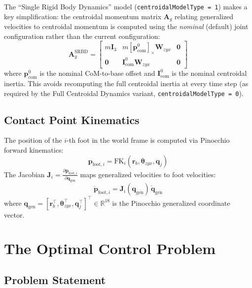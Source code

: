 \documentclass[11pt,a4paper]{article}
\newcommand{\R}{\mathbb{R}}
\newcommand{\skewmat}[1]{\left[ #1 \right]_\times}
\begin{document}
The ``Single Rigid Body Dynamics'' model (\texttt{centroidalModelType = 1}) makes a key simplification: the centroidal momentum matrix $\bm{A}_g$ relating generalized velocities to centroidal momentum is computed using the \emph{nominal} (default) joint configuration rather than the current configuration:
\begin{equation}
	\bm{A}_g^{\text{SRBD}} = \begin{bmatrix}
		m\bm{I}_3 & m\skewmat{\bm{p}_{\text{com}}^0}\bm{W}_{zyx} & \bm{0} \\
		\bm{0}    & \bm{I}_{\text{com}}^0 \bm{W}_{zyx}           & \bm{0}
	\end{bmatrix}
\end{equation}
where $\bm{p}_{\text{com}}^0$ is the nominal CoM-to-base offset and $\bm{I}_{\text{com}}^0$ is the nominal centroidal inertia. This avoids recomputing the full centroidal inertia at every time step (as required by the Full Centroidal Dynamics variant, \texttt{centroidalModelType = 0}).

\subsection{Contact Point Kinematics}

The position of the $i$-th foot in the world frame is computed via Pinocchio forward kinematics:
\begin{equation}
	\bm{p}_{\text{foot},i} = \text{FK}_i(\bm{r}_b, \bm{\theta}_{zyx}, \bm{q}_j)
\end{equation}
The Jacobian $\bm{J}_i = \frac{\partial \bm{p}_{\text{foot},i}}{\partial \bm{q}_{\text{gen}}}$ maps generalized velocities to foot velocities:
\begin{equation}
	\dot{\bm{p}}_{\text{foot},i} = \bm{J}_i(\bm{q}_{\text{gen}})\, \dot{\bm{q}}_{\text{gen}}
\end{equation}
where $\bm{q}_{\text{gen}} = [\bm{r}_b^\top, \bm{\theta}_{zyx}^\top, \bm{q}_j^\top]^\top \in \R^{18}$ is the Pinocchio generalized coordinate vector.


\section{The Optimal Control Problem}
\label{sec:ocp}

\subsection{Problem Statement}
\end{document}
